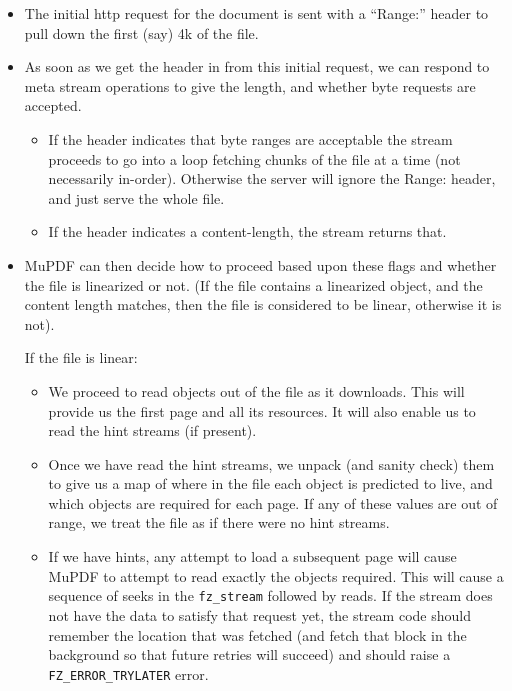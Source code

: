 \documentclass[oneside]{book}
\begin{document}
\begin{itemize}

\item
The initial http request for the document is sent with a ``Range:'' header to pull down the first (say) 4k of the file.

\item
As soon as we get the header in from this initial request, we can respond to meta stream operations to give the length, and whether byte requests are accepted.

\begin{itemize}
\item
If the header indicates that byte ranges are acceptable the stream proceeds to go into a loop fetching chunks of the file at a time (not necessarily in-order). Otherwise the server will ignore the Range: header, and just serve the whole file.

\item
If the header indicates a content-length, the stream returns that.
\end{itemize}

\item
MuPDF can then decide how to proceed based upon these flags and whether the file is linearized or not. (If the file contains a linearized object, and the content length matches, then the file is considered to be linear, otherwise it is not).

If the file is linear:

\begin{itemize}
\item
We proceed to read objects out of the file as it downloads. This will provide us the first page and all its resources. It will also enable us to read the hint streams (if present).

\item
Once we have read the hint streams, we unpack (and sanity check) them to give us a map of where in the file each object is predicted to live, and which objects are required for each page. If any of these values are out of range, we treat the file as if there were no hint streams.

\item
If we have hints, any attempt to load a subsequent page will cause MuPDF to attempt to read exactly the objects required. This will cause a sequence of seeks in the \texttt{fz\_stream} followed by reads. If the stream does not have the data to satisfy that request yet, the stream code should remember the location that was fetched (and fetch that block in the background so that future retries will succeed) and should raise a \texttt{FZ\_ERROR\_TRYLATER} error.


\end{itemize}
\end{itemize}
\end{document}
